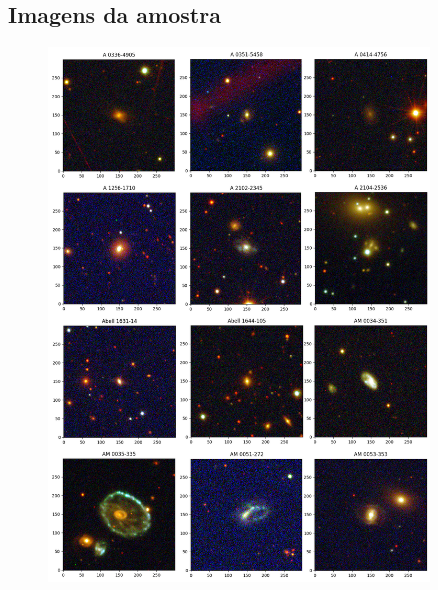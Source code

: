 \begin{anexosenv}

\chapter{Imagens da amostra} \label{anexo:imagens_amostra}

    \begin{figure}[h]
        \centering 
        \includegraphics[width=0.9\textwidth]{Imagens/imagem_01.png} 
        \caption[]{}
        \label{fig:imagem_01} 
    \end{figure}


\end{anexosenv}

